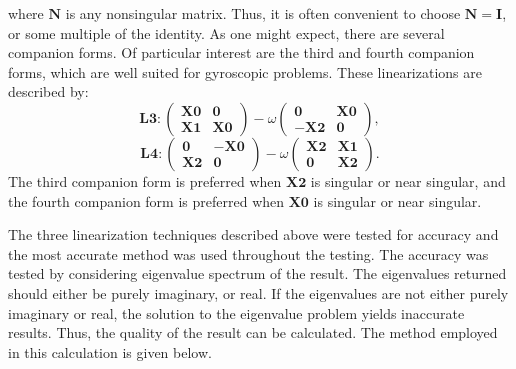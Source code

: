where $\mathbf{N}$ is any nonsingular matrix. Thus, it is often convenient to choose $\mathbf{N}=\mathbf{I}$, or some multiple of the identity. As one might expect, there are several companion forms. Of particular interest are the third and fourth companion forms, which are well suited for gyroscopic problems. These linearizations are described by:
\begin{equation}
\mathbf{L3:}
\begin{pmatrix}
\mathbf{X0} & \mathbf{0}\\
\mathbf{X1} & \mathbf{X0}
\end{pmatrix} -\omega
\begin{pmatrix}
\mathbf{0} & \mathbf{X0} \\
\mathbf{-X2} & \mathbf{0}
\end{pmatrix},
\end{equation}
\begin{equation}
\mathbf{L4:}
\begin{pmatrix}
\mathbf{0} & \mathbf{-X0}\\
\mathbf{X2} & \mathbf{0}
\end{pmatrix} -\omega
\begin{pmatrix}
\mathbf{X2} & \mathbf{X1} \\
\mathbf{0} & \mathbf{X2}
\end{pmatrix}.
\end{equation}
The third companion form is preferred when $\mathbf{X2}$ is singular or near singular, and the fourth companion form is preferred when $\mathbf{X0}$ is singular or near singular.

The three linearization techniques described above were tested for accuracy and the most accurate method was used throughout the testing. The accuracy was tested by considering eigenvalue spectrum of the result. The eigenvalues returned should either be purely imaginary, or real. If the eigenvalues are not either purely imaginary or real, the solution to the eigenvalue problem yields inaccurate results. Thus, the quality of the result can be calculated. The method employed in this calculation is given below.

